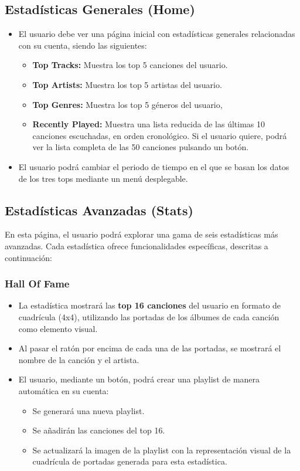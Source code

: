 \subsection{Estadísticas Generales (Home)}
\begin{itemize}
    \item El usuario debe ver una página inicial con estadísticas generales relacionadas con su cuenta, siendo las siguientes:
          \begin{itemize}
              \item \textbf{Top Tracks:} Muestra los top 5 canciones del usuario.
              \item \textbf{Top Artists:} Muestra los top 5 artistas del usuario.
              \item \textbf{Top Genres:} Muestra los top 5 géneros del usuario,
              \item \textbf{Recently Played:} Muestra una lista reducida de las últimas 10 canciones escuchadas, en orden cronológico. Si el usuario quiere, podrá ver la lista completa de las 50 canciones pulsando un botón.
          \end{itemize}
    \item El usuario podrá cambiar el periodo de tiempo en el que se basan los datos de los tres tops mediante un menú desplegable.
\end{itemize}

\subsection{Estadísticas Avanzadas (Stats)}

En esta página, el usuario podrá explorar una gama de seis estadísticas más avanzadas. Cada estadística ofrece funcionalidades específicas, descritas a continuación:

\subsubsection*{Hall Of Fame}

\begin{itemize}
    \item La estadística mostrará las \textbf{top 16 canciones} del usuario en formato de cuadrícula (4x4), utilizando las portadas de los álbumes de cada canción como elemento visual.
    \item Al pasar el ratón por encima de cada una de las portadas, se mostrará el nombre de la canción y el artista.
    \item El usuario, mediante un botón, podrá crear una playlist de manera automática en su cuenta:
          \begin{itemize}
              \item Se generará una nueva playlist.
              \item Se añadirán las canciones del top 16.
              \item Se actualizará la imagen de la playlist con la representación visual de la cuadrícula de portadas generada para esta estadística.
          \end{itemize}
\end{itemize}

